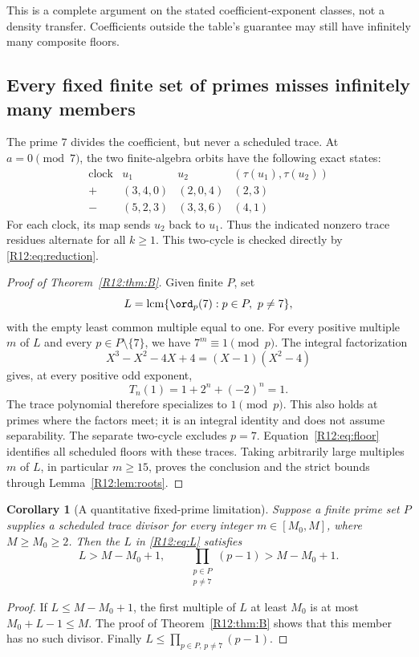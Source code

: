 \documentclass[11pt,a4paper]{article}
\newtheorem{corollary}[theorem]{Corollary}\newtheorem{mainthm}[theorem]{Theorem}
\theoremstyle{definition}\newtheorem{definition}[theorem]{Definition}
\theoremstyle{remark}\newtheorem{remark}[theorem]{Remark}
\DeclareMathOperator{\lcm}{lcm}\DeclareMathOperator{\disc}{disc}\DeclareMathOperator{\Res}{Res}
\begin{document}
This is a complete argument on the stated coefficient-exponent
classes, not a density transfer. Coefficients outside the table's
guarantee may still have infinitely many composite floors.

\subsection{Every fixed finite set of primes misses infinitely many members}

The prime $7$ divides the coefficient, but never a scheduled trace.
At $a=0\pmod7$, the two finite-algebra orbits have the following
exact states:
\[
\begin{array}{c|c|c|c}
 \text{clock}&u_1&u_2&(\tau(u_1),\tau(u_2))\\\hline
 +&(3,4,0)&(2,0,4)&(2,3)\\
 -&(5,2,3)&(3,3,6)&(4,1)
\end{array}
\]
For each clock, its map sends $u_2$ back to $u_1$.
Thus the indicated nonzero trace residues alternate for all $k\ge1$.
This two-cycle is checked directly by \eqref{R12:eq:reduction}.

\begin{proof}[Proof of Theorem~\ref{R12:thm:B}]
Given finite $P$, set
\begin{equation}\label{R12:eq:L}
 L=\lcm\{\ord_p(7):p\in P,\ p\ne7\},
\end{equation}
with the empty least common multiple equal to one. For every positive
multiple $m$ of $L$ and every $p\in P\setminus\{7\}$, we have
$7^m\equiv1\pmod p$. The integral factorization
\[
 X^3-X^2-4X+4=(X-1)(X^2-4)
\]
gives, at every positive odd exponent,
\begin{equation}\label{R12:eq:a1}
 T_n(1)=1+2^n+(-2)^n=1.
\end{equation}
The trace polynomial therefore specializes to $1\pmod p$.
This also holds at primes where the factors meet; it is an integral
identity and does not assume separability. The separate two-cycle
excludes $p=7$. Equation~\eqref{R12:eq:floor} identifies all scheduled
floors with these traces. Taking arbitrarily large multiples $m$ of
$L$, in particular $m\ge15$, proves the conclusion and the strict
bounds through Lemma~\ref{R12:lem:roots}.
\end{proof}

\begin{corollary}[A quantitative fixed-prime limitation]\label{R12:cor:bound}
Suppose a finite prime set $P$ supplies a scheduled trace divisor
for every integer $m\in[M_0,M]$, where $M\ge M_0\ge2$.
Then the $L$ in \eqref{R12:eq:L} satisfies
\[
 L>M-M_0+1,\qquad
 \prod_{\substack{p\in P\\p\ne7}}(p-1)>M-M_0+1.
\]
\end{corollary}
\begin{proof}
If $L\le M-M_0+1$, the first multiple of $L$ at least $M_0$ is
at most $M_0+L-1\le M$. The proof of Theorem~\ref{R12:thm:B} shows that
this member has no such divisor. Finally
$L\le\prod_{p\in P,\,p\ne7}(p-1)$.
\end{proof}
\end{document}
